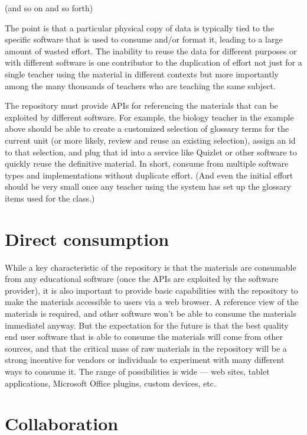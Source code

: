 (and so on and so forth)

The point is that a particular physical copy of data is typically tied
to the specific software that is used to consume and/or format it, leading
to a large amount of wasted effort.  The inability to reuse the data for
different purposes or with different software is one contributor to the duplication of effort
not just for a single teacher using the material in different contexts but
more importantly among
the many thousands of teachers who are teaching the same subject.

The repository must provide APIs for referencing the materials that
can be exploited by different software.  For example, the biology teacher
in the example above should be able to create a customized selection of
glossary terms for the current unit (or more likely,
review and reuse an existing selection), assign an id to that selection, and
plug that id into a service like Quizlet or other software to quickly reuse
the definitive material.  In short, consume from multiple software
types and implementations without duplicate effort.  (And even the initial
effort should be very small once any teacher using the system has set
up the glossary items used for the class.)

\section*{Direct consumption}

While a key characteristic of the repository is that the materials are
consumable from any educational software (once the APIs are exploited by
the software provider), it is also important to provide
basic capabilities with the repository to make the materials accessible
to users via a web browser.  A reference view of the materials is required,
and other software won't be able to consume the materials immediatel anyway.
But the expectation for the future is that the best quality end user software that is able
to consume the materials will come from other sources,
and that the critical mass of raw materials in the repository will be a
strong incentive for vendors or individuals to experiment with many different
ways to consume it.  The range of possibilities is wide --- web sites, tablet
applications, Microsoft Office plugins, custom devices, etc.

\section*{Collaboration}

